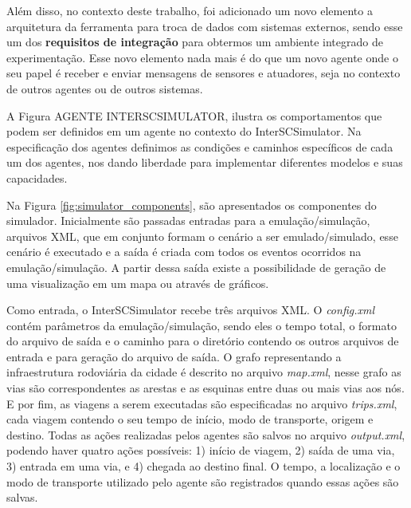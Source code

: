 Além disso, no contexto deste trabalho, foi adicionado um novo elemento a arquitetura da ferramenta para troca de dados com sistemas externos,
sendo esse um dos \textbf{requisitos de integração} para obtermos um ambiente integrado de experimentação.
Esse novo elemento nada mais é do que um novo agente onde o seu papel é receber e enviar mensagens de sensores e atuadores, seja no contexto de outros agentes ou de
outros sistemas.

A Figura AGENTE INTERSCSIMULATOR, ilustra os comportamentos que podem ser definidos em um agente no contexto do InterSCSimulator.
Na especificação dos agentes definimos as condições e caminhos específicos de cada um dos agentes, nos dando liberdade para implementar diferentes modelos e suas capacidades.

Na Figura \ref{fig:simulator_components}, são apresentados os componentes do simulador.
Inicialmente são passadas entradas para a emulação/simulação, arquivos XML, que em conjunto formam o cenário a ser emulado/simulado, esse cenário é executado e a
saída é criada com todos os eventos ocorridos na emulação/simulação.
A partir dessa saída existe a possibilidade de geração de uma visualização em um mapa ou através de gráficos.


Como entrada, o InterSCSimulator recebe três arquivos XML. O \textit{config.xml} contém parâmetros da emulação/simulação, sendo eles o tempo total, o formato do
arquivo de saída e o caminho para o diretório contendo os outros arquivos de entrada e para geração do arquivo de saída.
O grafo representando a infraestrutura rodoviária da cidade é descrito no arquivo \textit{map.xml}, nesse grafo as vias são correspondentes as arestas e as esquinas entre
duas ou mais vias aos nós.
E por fim, as viagens a serem executadas são especificadas no arquivo \textit{trips.xml}, cada viagem contendo o seu tempo de início, modo de transporte, origem e destino.
Todas as ações realizadas pelos agentes são salvos no arquivo \textit{output.xml}, podendo haver quatro ações possíveis: 1) início de viagem, 2) saída de uma via,
3) entrada em uma via, e 4) chegada ao destino final.
O tempo, a localização e o modo de transporte utilizado pelo agente são registrados quando essas ações são salvas.

